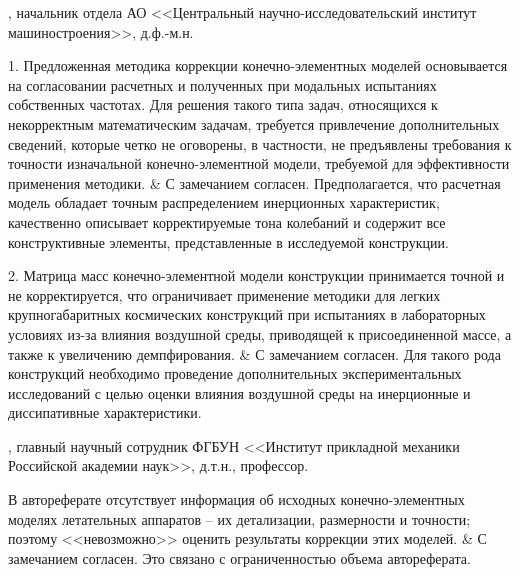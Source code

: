\begin{frame}
	\beginSkip
	, начальник отдела АО <<Центральный научно-исследовательский институт машиностроения>>, д.ф.-м.н.
	\begin{comtblr}{19em}
		1. Предложенная методика коррекции конечно-элементных моделей основывается на согласовании расчетных и полученных при модальных испытаниях собственных частотах. Для решения такого типа задач, относящихся к некорректным математическим задачам, требуется привлечение дополнительных сведений, которые четко не оговорены, в частности, не предъявлены требования к точности изначальной конечно-элементной модели, требуемой для эффективности применения методики.
		&
		С замечанием согласен. Предполагается, что расчетная модель обладает точным распределением инерционных характеристик, качественно описывает корректируемые тона колебаний и содержит все конструктивные элементы, представленные в исследуемой конструкции. \\
	\end{comtblr}
\end{frame}

\begin{frame}
	\beginSkip
	\begin{comtblr}{}
		2. Матрица масс конечно-элементной модели конструкции принимается точной и не корректируется, что ограничивает применение методики для легких крупногабаритных космических конструкций при испытаниях в лабораторных условиях из-за влияния воздушной среды, приводящей к присоединенной массе, а также к увеличению демпфирования. 
		&
		С замечанием согласен. Для такого рода конструкций необходимо проведение дополнительных экспериментальных исследований с целью оценки влияния воздушной среды на инерционные и диссипативные характеристики.
	\end{comtblr}
\end{frame}

\begin{frame}
	\beginSkip
	, главный научный сотрудник ФГБУН <<Институт прикладной механики Российской академии наук>>, д.т.н., профессор.
	\begin{comtblr}{}
		В автореферате отсутствует информация об исходных конечно-элементных моделях летательных аппаратов – их детализации, размерности и точности; поэтому <<невозможно>> оценить результаты коррекции этих моделей.
		&
		С замечанием согласен. Это связано с ограниченностью объема автореферата.		
	\end{comtblr}
\end{frame}

